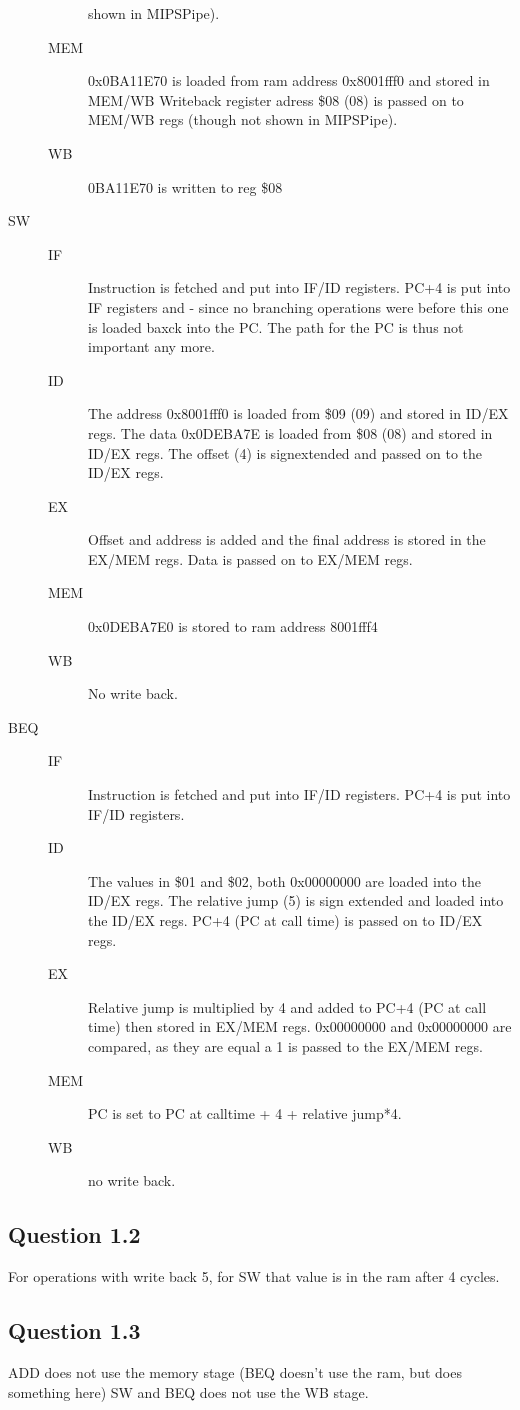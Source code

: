 \begin{description}
\begin{description}
	 shown in MIPSPipe).
	\item[MEM]
	 0x0BA11E70 is loaded from ram address 0x8001fff0 and stored in MEM/WB
	 Writeback register adress \$08 (08) is passed on to MEM/WB regs (though not
	 shown in MIPSPipe).
	\item[WB]
	 0BA11E70 is written to reg \$08
	\end{description}
\item[SW]
	\begin{description}
	\item[IF]
	 Instruction is fetched and put into IF/ID registers.
	 PC+4 is put into IF registers and - since no branching operations were before this one is loaded baxck into the PC. The path for the PC is thus not important any more.
	\item[ID]
	 The address 0x8001fff0 is loaded from \$09 (09) and stored in ID/EX regs.
	 The data 0x0DEBA7E is loaded from \$08 (08) and stored in ID/EX regs.
	 The offset (4) is signextended and passed on to the ID/EX regs.
	\item[EX]
	 Offset and address is added and the final address is stored in the EX/MEM regs.
	 Data is passed on to EX/MEM regs.
	\item[MEM]
	 0x0DEBA7E0 is  stored to ram address 8001fff4
	\item[WB]
	 No write back.
	\end{description}
\item[BEQ]
	\begin{description}
	\item[IF]
	 Instruction is fetched and put into IF/ID registers.
	 PC+4 is put into IF/ID registers.
	\item[ID]
	 The values in \$01 and \$02, both 0x00000000 are loaded into the ID/EX regs.
	 The relative jump (5) is sign extended and loaded into the ID/EX regs.
	 PC+4 (PC at call time) is passed on to ID/EX regs.
	\item[EX]
	 Relative jump is multiplied by 4 and added to PC+4 (PC at call time) then stored in EX/MEM regs.
	 0x00000000 and 0x00000000 are compared, as they are equal a 1 is passed to the EX/MEM regs. 
	\item[MEM]
	 PC is set to PC at calltime + 4 + relative jump*4.
	\item[WB]
	 no write back.
	\end{description}
\end{description}

\subsection{Question 1.2}
 For operations with write back 5, for SW that value is in the ram after 4 cycles.

\subsection{Question 1.3}
 ADD does not use the memory stage (BEQ doesn't use the ram, but does something here)
 SW and BEQ does not use the WB stage.
